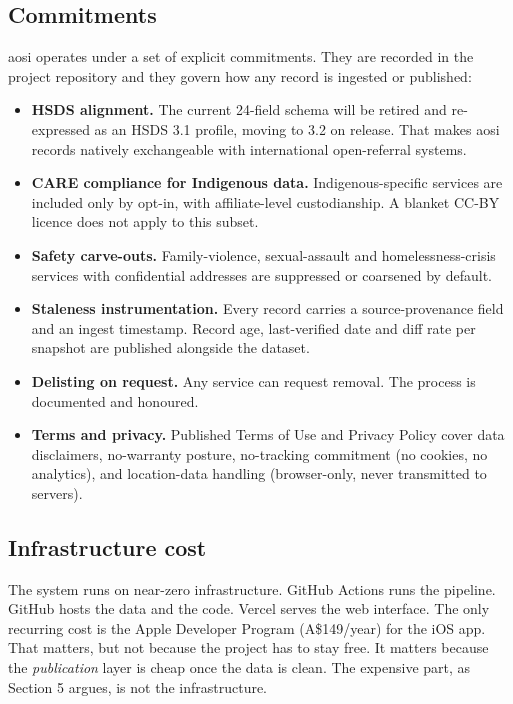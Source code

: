 \documentclass[11pt,a4paper]{article}
\begin{document}
\subsection{Commitments}

aosi operates under a set of explicit commitments. They are recorded in the project repository and they govern how any record is ingested or published:

\begin{itemize}[nosep]
    \item \textbf{HSDS alignment.} The current 24-field schema will be retired and re-expressed as an HSDS 3.1 profile, moving to 3.2 on release. That makes aosi records natively exchangeable with international open-referral systems.
    \item \textbf{CARE compliance for Indigenous data.} Indigenous-specific services are included only by opt-in, with affiliate-level custodianship. A blanket CC-BY licence does not apply to this subset.
    \item \textbf{Safety carve-outs.} Family-violence, sexual-assault and homelessness-crisis services with confidential addresses are suppressed or coarsened by default.
    \item \textbf{Staleness instrumentation.} Every record carries a source-provenance field and an ingest timestamp. Record age, last-verified date and diff rate per snapshot are published alongside the dataset.
    \item \textbf{Delisting on request.} Any service can request removal. The process is documented and honoured.
    \item \textbf{Terms and privacy.} Published Terms of Use and Privacy Policy cover data disclaimers, no-warranty posture, no-tracking commitment (no cookies, no analytics), and location-data handling (browser-only, never transmitted to servers).
\end{itemize}

\subsection{Infrastructure cost}

The system runs on near-zero infrastructure. GitHub Actions runs the pipeline. GitHub hosts the data and the code. Vercel serves the web interface. The only recurring cost is the Apple Developer Program (A\$149/year) for the iOS app. That matters, but not because the project has to stay free. It matters because the \emph{publication} layer is cheap once the data is clean. The expensive part, as Section 5 argues, is not the infrastructure.
\end{document}
